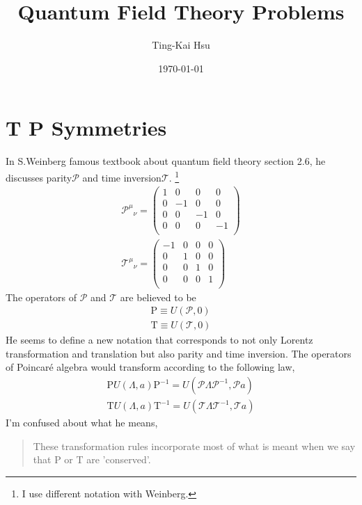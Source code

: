 \documentclass[12pt]{article}
\title{Quantum Field Theory Problems}
\author{Ting-Kai Hsu}
\date{\today}
\numberwithin{equation}{subsection}
\begin{document}
\maketitle
\tableofcontents
\section{T P Symmetries}
In S.Weinberg famous textbook about quantum field theory\cite{Weinberg_1995} section 2.6, he discusses parity$\mathcal{P}$ and time inversion$\mathcal{T}$. 
\footnote{I use different notation with Weinberg.}
\begin{equation}
    \begin{split}
        \mathcal{P}^{\mu}_{\,\,\,\,\nu} = \begin{pmatrix}
            1&0&0&0\\
            0&-1&0&0\\
            0&0&-1&0\\
            0&0&0&-1\\
        \end{pmatrix}\\
        \mathcal{T}_{\,\,\,\,\nu}^{\mu} = \begin{pmatrix}
            -1&0&0&0\\
            0&1&0&0\\
            0&0&1&0\\
            0&0&0&1\\
        \end{pmatrix}
    \end{split}
\end{equation}
The operators of $\mathcal{P}$ and $\mathcal{T}$ are believed to be
\begin{equation}
    \begin{split}
        \text{P} \equiv U(\mathcal{P}, 0)\\
        \text{T} \equiv U(\mathcal{T}, 0)
    \end{split}
\end{equation}
He seems to define a new notation that corresponds to not only Lorentz transformation and translation but also parity and time inversion.
The operators of Poincar\'e algebra would transform according to the following law,
\begin{equation}
    \begin{split}
        \text{P}U(\Lambda, a)\text{P}^{-1} = U(\mathcal{P}\Lambda\mathcal{P}^{-1}, \mathcal{P}a)\\
        \text{T}U(\Lambda, a)\text{T}^{-1} = U(\mathcal{T}\Lambda\mathcal{T}^{-1}, \mathcal{T}a)
    \end{split}
\end{equation}
I'm confused about what he means,
\begin{quotation}
    These transformation rules incorporate most of what is meant when we say that P or T are 'conserved'.
\end{quotation}
\end{document}
